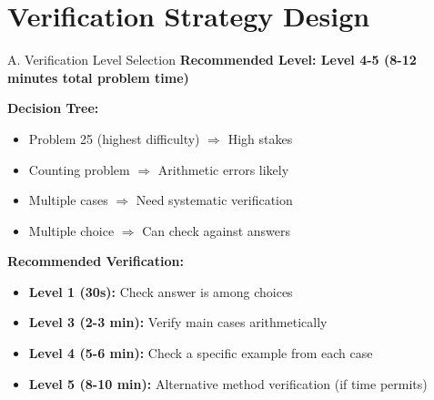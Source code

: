 \documentclass[12pt]{article}
\begin{document}
\section{Verification Strategy Design}

\begin{verificationbox}{A. Verification Level Selection}
\textbf{Recommended Level: Level 4-5 (8-12 minutes total problem time)}

\textbf{Decision Tree:}
\begin{itemize}
    \item Problem 25 (highest difficulty) $\Rightarrow$ High stakes
    \item Counting problem $\Rightarrow$ Arithmetic errors likely
    \item Multiple cases $\Rightarrow$ Need systematic verification
    \item Multiple choice $\Rightarrow$ Can check against answers
\end{itemize}

\textbf{Recommended Verification:}
\begin{itemize}
    \item \textbf{Level 1 (30s):} Check answer is among choices
    \item \textbf{Level 3 (2-3 min):} Verify main cases arithmetically
    \item \textbf{Level 4 (5-6 min):} Check a specific example from each case
    \item \textbf{Level 5 (8-10 min):} Alternative method verification (if time permits)
\end{itemize}
\end{verificationbox}
\end{document}
